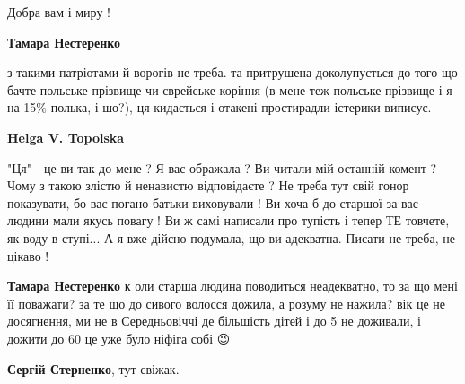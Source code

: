 \begin{itemize}
\begin{itemize}
\begin{itemize}
Добра вам і миру !

 
\textbf{Тамара Нестеренко} 

з такими патріотами й ворогів не треба. та притрушена доколупується до того що
бачте польське прізвище чи єврейське коріння (в мене теж польське прізвище і я
на 15\% полька, і шо?), ця кидається і отакені простирадли істерики виписує.

 
\textbf{Helga V. Topolska} 

"Ця" - це ви так до мене ? Я вас ображала ? Ви читали мій останній комент ? Чому
з такою злістю й ненавистю відповідаєте ? Не треба тут свій гонор показувати,
бо вас погано батьки виховували ! Ви хоча б до старшої за вас людини мали якусь
повагу ! Ви ж самі написали про тупість і тепер ТЕ товчете, як воду в ступі... А
я вже дійсно подумала, що ви адекватна. Писати не треба, не цікаво !


\textbf{Тамара Нестеренко} к
оли старша людина поводиться неадекватно, то за що мені її поважати? за те що
до сивого волосся дожила, а розуму не нажила? вік це не досягнення, ми не в
Середньовіччі де більшість дітей і до 5 не доживали, і дожити до 60 це уже було
ніфіга собі 😉
\end{itemize}

\end{itemize}

 
\textbf{Сергій Стерненко}, тут свіжак.

\begin{itemize}
 

\end{itemize}
\end{itemize}
